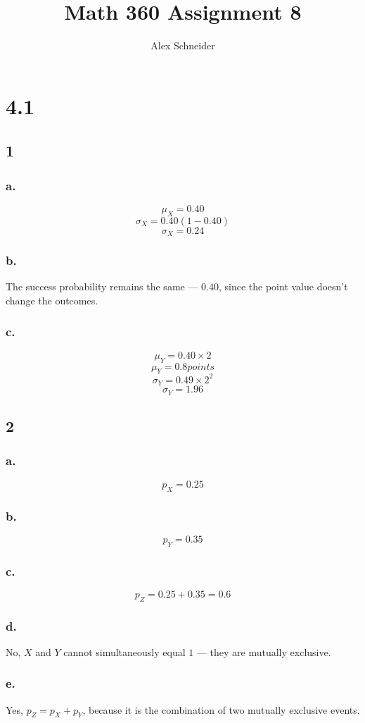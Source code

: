 \documentclass[11pt]{article}
\title{Math 360 Assignment 8}
\author{Alex Schneider}
\begin{document}
\maketitle
\section*{4.1}
\subsection*{1}
\subsubsection*{a.}
\[\mu_X = 0.40 \]
\[\sigma_X = 0.40(1-0.40) \]
\[\sigma_X = 0.24 \]
\subsubsection*{b.}
The success probability remains the same --- 0.40, since the point value doesn't
change the outcomes. 

\subsubsection*{c.}
\[ \mu_Y = 0.40 \times 2 \]
\[ \mu_Y = 0.8 points \]
\[ \sigma_Y = 0.49 \times 2^2 \]
\[ \sigma_Y = 1.96 \]

\subsection*{2}
\subsubsection*{a.}
\[ p_X = 0.25 \]
\subsubsection*{b.}
\[ p_Y = 0.35 \]
\subsubsection*{c.}
\[ p_Z = 0.25 + 0.35 = 0.6 \]
\subsubsection*{d.}
No, $X$ and $Y$ cannot simultaneously equal $1$ --- they are mutually exclusive.
\subsubsection*{e.}
Yes, $p_Z = p_X + p_Y$, because it is the combination of two mutually exclusive
events.
\end{document}
